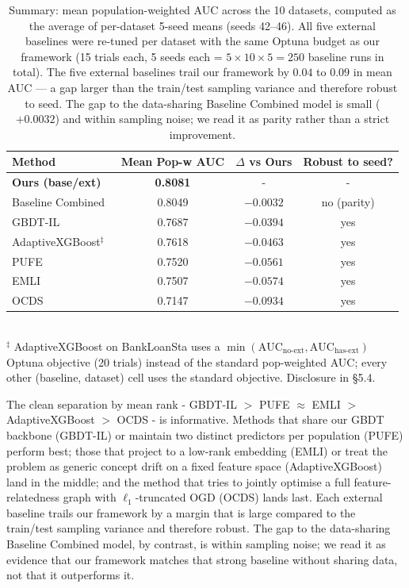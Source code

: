 \documentclass[sigconf]{acmart}
\begin{document}
\begin{itemize}
\begin{table}[h]
\centering
\caption{Summary: mean population-weighted AUC across the 10 datasets, computed as the average of per-dataset 5-seed means (seeds 42--46). All five external baselines were re-tuned per dataset with the same Optuna budget as our framework (15 trials each, 5 seeds each = $5\times10\times5 = 250$ baseline runs in total). The five external baselines trail our framework by $0.04$ to $0.09$ in mean AUC --- a gap larger than the train/test sampling variance and therefore robust to seed. The gap to the data-sharing Baseline Combined model is small ($+0.0032$) and within sampling noise; we read it as parity rather than a strict improvement.}
\label{tab:baseline_summary}
\begin{tabular}{l c c c}
\toprule
\textbf{Method} & \textbf{Mean Pop-w AUC} & \textbf{$\Delta$ vs Ours} & \textbf{Robust to seed?} \\
\midrule
\textbf{Ours (base/ext)}       & \textbf{0.8081} & - & - \\
Baseline Combined              & 0.8049 & $-0.0032$ & no (parity) \\
GBDT-IL~\cite{chen2024gbdtil} & 0.7687 & $-0.0394$ & yes \\
AdaptiveXGBoost$^{\ddagger}$~\cite{montiel2020axgb} & 0.7618 & $-0.0463$ & yes \\
PUFE~\cite{he2021pufe}         & 0.7520 & $-0.0561$ & yes \\
EMLI~\cite{dong2021eml}        & 0.7507 & $-0.0574$ & yes \\
OCDS~\cite{he2019ocds}         & 0.7147 & $-0.0934$ & yes \\
\bottomrule
\end{tabular}
\\[2pt]
{\footnotesize $^{\ddagger}$ AdaptiveXGBoost on BankLoanSta uses a $\min(\text{AUC}_\text{no-ext}, \text{AUC}_\text{has-ext})$ Optuna objective (20 trials) instead of the standard pop-weighted AUC; every other (baseline, dataset) cell uses the standard objective. Disclosure in §5.4.}
\end{table}

The clean separation by mean rank - GBDT-IL $>$ PUFE $\approx$ EMLI $>$ AdaptiveXGBoost $>$ OCDS - is informative. Methods that share our GBDT backbone (GBDT-IL) or maintain two distinct predictors per population (PUFE) perform best; those that project to a low-rank embedding (EMLI) or treat the problem as generic concept drift on a fixed feature space (AdaptiveXGBoost) land in the middle; and the method that tries to jointly optimise a full feature-relatedness graph with $\ell_1$-truncated OGD (OCDS) lands last. Each external baseline trails our framework by a margin that is large compared to the train/test sampling variance and therefore robust. The gap to the data-sharing Baseline Combined model, by contrast, is within sampling noise; we read it as evidence that our framework matches that strong baseline without sharing data, not that it outperforms it.


\end{itemize}
\end{document}
